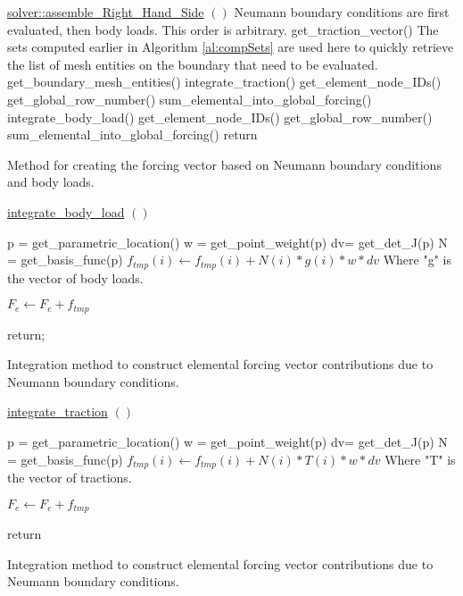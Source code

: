 \documentclass[a4paper, 12pt]{article}
\begin{document}
\vspace{\baselineskip}
\begin{algorithm}[H]
  \underline{solver::assemble\_Right\_Hand\_Side} $()$
  \BlankLine
  \tcc
  {
    Neumann boundary conditions are first evaluated, 
    then body loads. This order is arbitrary.
  }
  {
    get\_traction\_vector()\;
    \tcc
    {
      The sets computed earlier in Algorithm \ref{al:compSets}
      are used here to quickly 
      retrieve the list of mesh entities on the boundary 
      that need to be evaluated.
    }
    get\_boundary\_mesh\_entities()\;
    {
      integrate\_traction()\;
      get\_element\_node\_IDs()\;
      {
        get\_global\_row\_number()\;
        sum\_elemental\_into\_global\_forcing()\;
      }
    }
  }
  {
    integrate\_body\_load()\;
    get\_element\_node\_IDs()\;
    {
      get\_global\_row\_number()\;
      sum\_elemental\_into\_global\_forcing()\;
    }
  }
  return\;
  \caption{Method for creating the forcing vector based on Neumann boundary 
            conditions and body loads.}
  \label{al:AssembleRHS}
\end{algorithm}

\vspace{\baselineskip}
\begin{algorithm} 
  \underline{integrate\_body\_load} $()$
  \BlankLine
  {
    p = get\_parametric\_location()\;
    w = get\_point\_weight(p)\;
    dv= get\_det\_J(p)\;
    N = get\_basis\_func(p)\;
    {
      {
        $f_{tmp}(i) \leftarrow f_{tmp}(i) + N(i) * g(i) * w * dv$ \;
        \tcc
        {
          Where "g" is the vector of body loads.
        }
      }
    }

    $F_e \leftarrow F_e + f_{tmp}$\;
  }
  return;
  \caption{Integration method to construct elemental forcing vector
            contributions due to Neumann boundary conditions.}
  \label{al:BLC_int}
\end{algorithm}

\vspace{\baselineskip}
\begin{algorithm} 
  \underline{integrate\_traction} $()$
  \BlankLine
  {
    p = get\_parametric\_location()\;
    w = get\_point\_weight(p)\;
    dv= get\_det\_J(p)\;
    N = get\_basis\_func(p)\;
    {
      {
        $f_{tmp}(i) \leftarrow f_{tmp}(i) + N(i) * T(i) * w * dv$ \;
        \tcc
        {
          Where "T" is the vector of tractions.
        }
      }
    }

    $F_e \leftarrow F_e + f_{tmp}$\;
  }
  return\;
  \caption{Integration method to construct elemental forcing vector
            contributions due to Neumann boundary conditions.}
  \label{al:NBC_int}
\end{algorithm}
\end{document}
